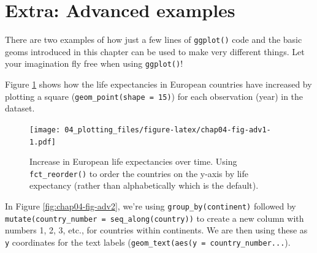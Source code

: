 \documentclass[
  12pt,
  krantz2]{krantz}
\makeatletter
\newenvironment{Shaded}{\begin{snugshade}}{\end{snugshade}}
\newcommand{\DataTypeTok}[1]{\textcolor[rgb]{0.13,0.29,0.53}{#1}}
\newcommand{\DecValTok}[1]{\textcolor[rgb]{0.00,0.00,0.81}{#1}}
\newcommand{\KeywordTok}[1]{\textcolor[rgb]{0.13,0.29,0.53}{\textbf{#1}}}
\newcommand{\NormalTok}[1]{#1}
\newcommand{\OperatorTok}[1]{\textcolor[rgb]{0.81,0.36,0.00}{\textbf{#1}}}
\newcommand{\StringTok}[1]{\textcolor[rgb]{0.31,0.60,0.02}{#1}}
\newenvironment{kframe}{%
\medskip{}
\setlength{\fboxsep}{.8em}
 \def\at@end@of@kframe{}%
 \ifinner\ifhmode%
  \def\at@end@of@kframe{\end{minipage}}%
  \begin{minipage}{\columnwidth}%
 \fi\fi%
 \def\FrameCommand##1{\hskip\@totalleftmargin \hskip-\fboxsep
 \colorbox{shadecolor}{##1}\hskip-\fboxsep
     \hskip-\linewidth \hskip-\@totalleftmargin \hskip\columnwidth}%
 \MakeFramed {\advance\hsize-\width
   \@totalleftmargin\z@ \linewidth\hsize
   \@setminipage}}%
 {\par\unskip\endMakeFramed%
 \at@end@of@kframe}
\renewenvironment{Shaded}{\begin{kframe}}{\end{kframe}}
\makeatother
\begin{document}
\hypertarget{extra-advanced-examples}{%
\section{Extra: Advanced examples}\label{extra-advanced-examples}}

There are two examples of how just a few lines of \texttt{ggplot()} code and the basic geoms introduced in this chapter can be used to make very different things.
Let your imagination fly free when using \texttt{ggplot()}!

Figure \ref{fig:chap04-fig-adv1} shows how the life expectancies in European countries have increased by plotting a square (\texttt{geom\_point(shape\ =\ 15)}) for each observation (year) in the dataset.

\begin{Shaded}
\end{Shaded}

\begin{figure}
\centering
\texttt{[image: 04\_plotting\_files/figure-latex/chap04-fig-adv1-1.pdf]}
\caption{\label{fig:chap04-fig-adv1}Increase in European life expectancies over time. Using \texttt{fct\_reorder()} to order the countries on the y-axis by life expectancy (rather than alphabetically which is the default).}
\end{figure}

In Figure \ref{fig:chap04-fig-adv2}, we're using \texttt{group\_by(continent)} followed by \texttt{mutate(country\_number\ =\ seq\_along(country))} to create a new column with numbers 1, 2, 3, etc., for countries within continents.
We are then using these as \texttt{y} coordinates for the text labels (\texttt{geom\_text(aes(y\ =\ country\_number...}).
\end{document}
